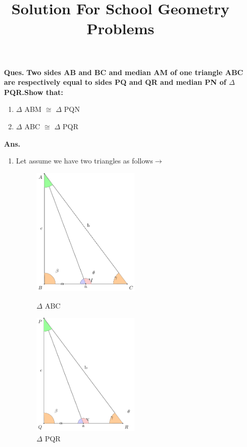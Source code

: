 \documentclass[12pt,a4paper]{exam}
\title{\textbf{Solution For School Geometry Problems}}
\begin{document}
	\maketitle

	\begin{enumerate}
		\item[\textbf{Ques.}] 
		\textbf{ Two sides AB and BC and median AM of one
		triangle ABC are respectively equal to sides PQ
		and QR and median PN of $\Delta$ PQR.Show that:}

	\begin{enumerate}
		\item$\Delta$ ABM $\cong$ $\Delta$ PQN  
		\item$\Delta$ ABC $\cong$ $\Delta$ PQR
	\end{enumerate}
	
	\item [\textbf{Ans.}]

	\begin{enumerate}
		\item Let assume we have two triangles as follows$\to$\\
		\begin{figure}[!htb]
			\begin{minipage}{0.48\textwidth}
				\centering
				\includegraphics[width=2.0in]{./congurentpicabc.pdf}
				\caption{$\Delta$ ABC}
				\label{fig:triangle}
	    	\end{minipage}
	    	\hfill
	    	\begin{minipage}{0.48\textwidth}
				\centering
				\includegraphics[width=2.0in]{./congurentpicabc2.pdf}
				\caption{$\Delta$ PQR }
				\label{fig:triangle2}
	   	 	\end{minipage}	
    	\end{figure}


\end{enumerate}
\end{enumerate}
\end{document}
